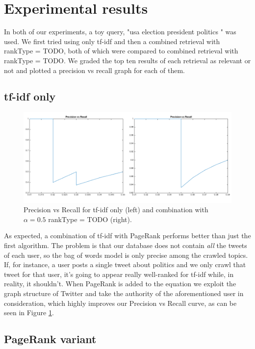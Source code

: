 \section{Experimental results}

In both of our experiments, a toy query, "usa election president politics " was
used. We first tried using only tf-idf and then a combined retrieval with rankType =
TODO, both of which were compared to combined retrieval with rankType = TODO. We
graded the top ten results of each retrieval as relevant or not and plotted a
precision vs recall graph for each of them.

\subsection{tf-idf only}

\begin{figure}[H]
\centering
\includegraphics[width=5.5in,natwidth=534,natheight=345]{images/exptfidf.png}
\caption{Precision vs Recall for tf-idf only (left) and combination with $\alpha = 0.5$ rankType = TODO (right).}
\label{fig:exptfidf}
\end{figure}

As expected, a combination of tf-idf with PageRank performs better than just the
first algorithm.  The problem is that our database does not contain \emph{all}
the tweets of each user, so the bag of words model is only precise among the
crawled topics. If, for instance, a user posts a single tweet about politics and
we only crawl that tweet for that user, it's going to appear really well-ranked
for tf-idf while, in reality, it shouldn't. When PageRank is added to the
equation we exploit the graph structure of Twitter and take the authority of the
aforementioned user in consideration, which highly improves our Precision vs
Recall curve, as can be seen in Figure \ref{fig:exptfidf}.

\subsection{PageRank variant}

